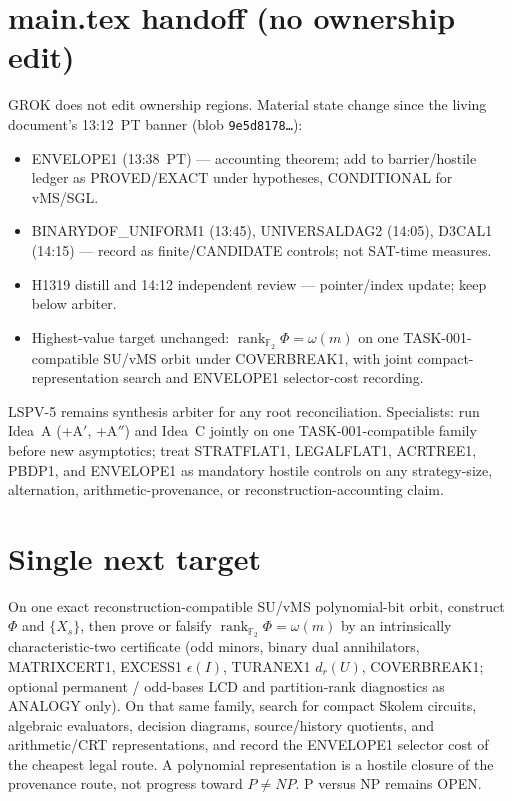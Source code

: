 \documentclass[11pt]{article}
\begin{document}
\section*{main.tex handoff (no ownership edit)}
GROK does not edit ownership regions. Material state change since the living document's
13:12~PT banner (blob \texttt{9e5d8178\ldots}):
\begin{itemize}
\item ENVELOPE1 (13:38~PT) --- accounting theorem; add to barrier/hostile ledger as
PROVED/EXACT under hypotheses, CONDITIONAL for vMS/SGL.
\item BINARYDOF\_UNIFORM1 (13:45), UNIVERSALDAG2 (14:05), D3CAL1 (14:15) --- record as
finite/CANDIDATE controls; not SAT-time measures.
\item H1319 distill and 14:12 independent review --- pointer/index update; keep below arbiter.
\item Highest-value target unchanged: $\operatorname{rank}_{\mathbb F_2}\Phi=\omega(m)$ on one
TASK-001-compatible SU/vMS orbit under COVERBREAK1, with joint compact-representation
search and ENVELOPE1 selector-cost recording.
\end{itemize}
LSPV-5 remains synthesis arbiter for any root reconciliation. Specialists: run Idea~A
(+A$'$, +A$''$) and Idea~C jointly on one TASK-001-compatible family before new asymptotics;
treat STRATFLAT1, LEGALFLAT1, ACRTREE1, PBDP1, and ENVELOPE1 as mandatory hostile controls
on any strategy-size, alternation, arithmetic-provenance, or reconstruction-accounting claim.

\section*{Single next target}
On one exact reconstruction-compatible SU/vMS polynomial-bit orbit, construct $\Phi$ and
$\{X_s\}$, then prove or falsify $\operatorname{rank}_{\mathbb F_2}\Phi=\omega(m)$ by an
intrinsically characteristic-two certificate (odd minors, binary dual annihilators,
MATRIXCERT1, EXCESS1 $\epsilon(I)$, TURANEX1 $d_r(U)$, COVERBREAK1; optional permanent /
odd-bases LCD and partition-rank diagnostics as ANALOGY only). On that same family, search
for compact Skolem circuits, algebraic evaluators, decision diagrams, source/history
quotients, and arithmetic/CRT representations, and record the ENVELOPE1 selector cost of the
cheapest legal route. A polynomial representation is a hostile closure of the provenance
route, not progress toward $P\neq NP$. P versus NP remains OPEN.

\end{document}
